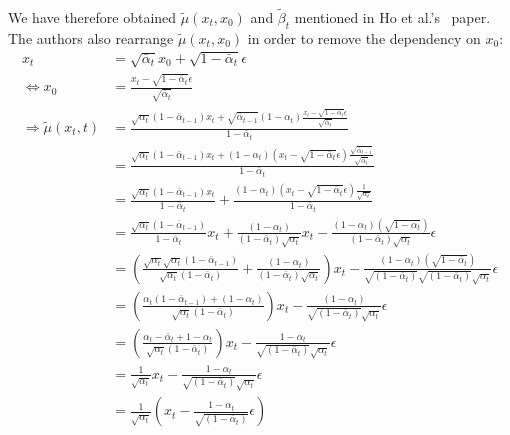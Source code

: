 \documentclass{article}
\numberwithin{equation}{section}
\numberwithin{figure}{section}
\begin{document}
{
\allowdisplaybreaks \\
We have therefore obtained $\tilde{\mu}(x_t, x_0)$ and $\tilde{\beta}_t$ mentioned in Ho et al.'s~\cite{ho2020denoising} paper. \\
The authors also rearrange $\tilde{\mu}(x_t, x_0)$ in order to remove the dependency on $x_0$: \\
  \begin{align}
    x_t &= \sqrt{\bar{\alpha}_t} x_0 + \sqrt{1 - \bar{\alpha}_t} \epsilon \\
    \Leftrightarrow x_0 &= \frac{x_t - \sqrt{1 - \bar{\alpha}_t} \epsilon}{\sqrt{\bar{\alpha}_t}} \label{eq:x0fromxt} \\
    \Rightarrow \tilde{\mu}(x_t, t) &= \frac{\sqrt{\alpha_t}(1 - \bar{\alpha}_{t-1}) x_t + \sqrt{\bar{\alpha}_{t-1}}(1 - \alpha_t) \frac{x_t - \sqrt{1 - \bar{\alpha}_t} \epsilon}{\sqrt{\bar{\alpha}_t}}}{1 - \bar{\alpha}_t} \\
    &= \frac{\sqrt{\alpha_t}(1 - \bar{\alpha}_{t-1}) x_t + (1 - \alpha_t) \left(x_t - \sqrt{1 - \bar{\alpha}_t} \epsilon \right) \frac{\sqrt{\bar{\alpha}_{t-1}}}{\sqrt{\bar{\alpha}_t}}}{1 - \bar{\alpha}_t} \\
    &= \frac{\sqrt{\alpha_t}(1 - \bar{\alpha}_{t-1}) x_t}{{1 - \bar{\alpha}_t}} + \frac{(1 - \alpha_t) \left(x_t - \sqrt{1 - \bar{\alpha}_t} \epsilon \right) \frac{1}{\sqrt{\alpha_t}}}{1 - \bar{\alpha}_t} \\
    &= \frac{\sqrt{\alpha_t}(1 - \bar{\alpha}_{t-1})}{{1 - \bar{\alpha}_t}} x_t + \frac{(1 - \alpha_t)}{(1 - \bar{\alpha}_t) \sqrt{\alpha_t}} x_t - \frac{(1 - \alpha_t)(\sqrt{1 - \bar{\alpha}_t})}{(1 - \bar{\alpha}_t)\sqrt{\alpha_t}} \epsilon \\
    &= \left( \frac{\sqrt{\alpha_t} \sqrt{\alpha_t}(1 - \bar{\alpha}_{t-1})}{\sqrt{\alpha_t} ({1 - \bar{\alpha}_t})}+ \frac{(1 - \alpha_t)}{(1 - \bar{\alpha}_t) \sqrt{\alpha_t}} \right) x_t - \frac{(1 - \alpha_t)(\sqrt{1 - \bar{\alpha}_t})}{\sqrt{(1 - \bar{\alpha}_t)}\sqrt{(1 - \bar{\alpha}_t)}\sqrt{\alpha_t}} \epsilon \\
    &= \left( \frac{\alpha_t (1 - \bar{\alpha}_{t-1}) + (1 - \alpha_t)}{\sqrt{\alpha_t} ({1 - \bar{\alpha}_t})} \right) x_t - \frac{(1 - \alpha_t)}{\sqrt{(1 - \bar{\alpha}_t)}\sqrt{\alpha_t}} \epsilon \\
    &= \left( \frac{\alpha_t - \bar{\alpha}_{t} + 1 - \alpha_t}{\sqrt{\alpha_t} ({1 - \bar{\alpha}_t})} \right) x_t - \frac{1 - \alpha_t}{\sqrt{(1 - \bar{\alpha}_t)}\sqrt{\alpha_t}} \epsilon \\
    &= \frac{1}{\sqrt{\alpha_t}} x_t - \frac{1 - \alpha_t}{\sqrt{(1 - \bar{\alpha}_t)}\sqrt{\alpha_t}} \epsilon \\
    &= \frac{1}{\sqrt{\alpha_t}} \left( x_t - \frac{1 - \alpha_t}{\sqrt{(1 - \bar{\alpha}_t)}} \epsilon \right)
  \end{align}
}
\end{document}
